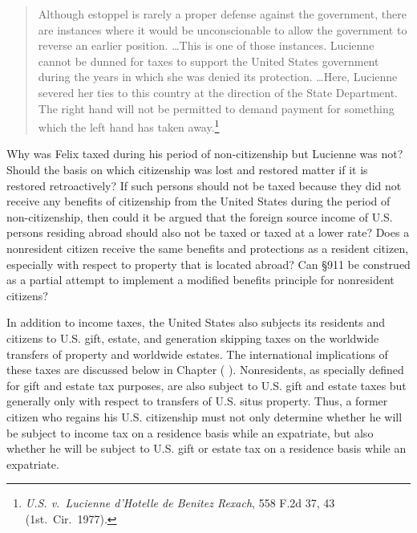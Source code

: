 \begin{quote}
Although estoppel is rarely a proper defense against the government, there are instances where it would be unconscionable to allow the government to reverse an earlier position. \ldots This is one of those instances. Lucienne cannot be dunned for taxes to support the United States government during the years in which she was denied its protection. \ldots Here, Lucienne severed her ties to this country at the direction of the State Department. The right hand will not be permitted to demand payment for something which the left hand has taken away.\footnote{\textit{U.S. v.\ Lucienne d'Hotelle de Benitez Rexach}, 558 F.2d 37, 43 (1st.\ Cir.\ 1977).}
\end{quote}

Why was Felix taxed during his period of non-citizenship but Lucienne was not?  Should the basis on which citizenship was lost and restored matter if it is restored retroactively? If such persons should not be taxed because they did not receive any benefits of citizenship from the United States during the period of non-citizenship, then could it be argued that the foreign source income of U.S. persons residing abroad should also not be taxed or taxed at a lower rate?  Does a nonresident citizen receive the same benefits and protections as a resident citizen, especially with respect to property that is located abroad?  Can \S911 be construed as a partial attempt to implement a modified benefits principle for nonresident citizens? 

In addition to income taxes, the United States also subjects its residents and citizens to U.S. gift, estate, and generation skipping taxes on the worldwide transfers of property and worldwide estates.  The international implications of these taxes are discussed below in Chapter (  ).  Nonresidents, as specially defined for gift and estate tax purposes, are also subject to U.S. gift and estate taxes but generally only with respect to transfers of U.S. situs property.  Thus, a former citizen who regains his U.S. citizenship must not only determine whether he will be subject to income tax on a residence basis while an expatriate, but also whether he will be subject to U.S. gift or estate tax on a residence basis while an expatriate.

